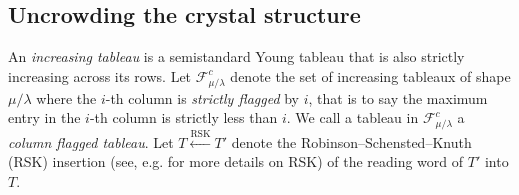 \documentclass[10pt]{amsart}
\theoremstyle{definition}
\providecommand{\eg}{e.g.}
\DeclareMathOperator{\RSK}{RSK} %
\newcommand{\mcF}{\mathcal{F}}
\newcommand{\defn}[1]{{\color{darkred}\emph{#1}}} %
\begin{document}
\subsection{Uncrowding the crystal structure}
\label{sec:uncrowding}

An \defn{increasing tableau} is a semistandard Young tableau that is also strictly increasing across its rows.
Let $\mcF^c_{\mu/\lambda}$ denote the set of increasing tableaux of shape $\mu/\lambda$ where the $i$-th column is \defn{strictly flagged} by $i$, that is to say the maximum entry in the $i$-th column is strictly less than $i$.
We call a tableau in $\mcF^c_{\mu/\lambda}$ a \defn{column flagged tableau}.
Let $T \xleftarrow{\RSK} T'$ denote the Robinson--Schensted--Knuth (RSK) insertion (see, \eg \cite{ECII} for more details on RSK) of the reading word of $T'$ into $T$.
\end{document}
